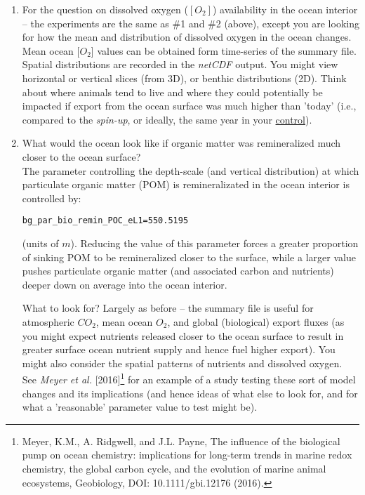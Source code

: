 \begin{enumerate}[noitemsep]
\vspace{1mm}
\item For the question on dissolved oxygen (\([O_{2}]\)) availability in the ocean interior -- the experiments are the same as \#1 and \#2 (above), except you are looking for how the mean and distribution of dissolved oxygen in the ocean changes. Mean ocean [\(O_{2}\)] values can be obtained form time-series of the summary file. Spatial distributions are recorded in the \textit{netCDF} output. You might view horizontal or vertical slices (from 3D), or benthic distributions (2D). Think about where animals tend to live and where they could potentially be impacted if export from the ocean surface was much higher than 'today' (i.e., compared to the \textit{spin-up}, or ideally, the same year in your \uline{control}).

\vspace{1mm}
\item What would the ocean look like if organic matter was remineralized much closer to the ocean surface?
\\The parameter controlling the depth-scale (and vertical distribution) at which particulate organic matter (POM) is remineralizated in the ocean interior is controlled by:
\vspace{-1pt}\small\begin{verbatim}
bg_par_bio_remin_POC_eL1=550.5195
\end{verbatim}\normalsize\vspace{-1pt}
(units of \(m\)). Reducing the value of this parameter forces a greater proportion of sinking POM to be remineralized closer to the surface, while a larger value pushes particulate organic matter  (and associated carbon and nutrients) deeper down on average into the ocean interior.

\vspace{1mm}
\noindent What to look for? Largely as before -- the summary file is useful for atmospheric \(CO_{2}\), mean ocean {\(O_{2}\)}, and global (biological) export fluxes (as you might expect nutrients released closer to the ocean surface to result in greater surface ocean nutrient supply and hence fuel higher export). You might also consider the spatial patterns of nutrients and dissolved oxygen.
\\See \textit{Meyer et al.} [2016]\footnote{Meyer, K.M., A. Ridgwell, and J.L. Payne, The influence of the biological pump on ocean chemistry: implications for long-term trends in marine redox chemistry, the global carbon cycle, and the evolution of marine animal ecosystems, Geobiology, DOI: 10.1111/gbi.12176 (2016).} for an example of a study testing these sort of model changes and its implications (and hence ideas of what else to look for, and for what a 'reasonable' parameter value to test might be).


\end{enumerate}
